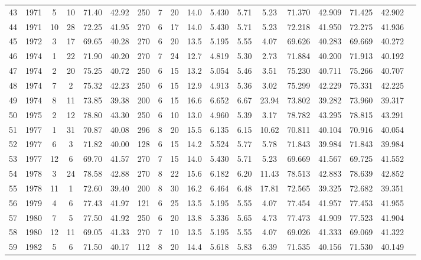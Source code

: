 \begin{longtable}{cccccccccccccccccc}
  43 & 1971 & 5 & 10 & 71.40 & 42.92 & 250 & 7 & 20 & 14.0 & 5.430 & 5.71 & 5.23 & 71.370 & 42.909 & 71.425 & 42.902 \\ 
  44 & 1971 & 10 & 28 & 72.25 & 41.95 & 270 & 6 & 17 & 14.0 & 5.430 & 5.71 & 5.23 & 72.218 & 41.950 & 72.275 & 41.936 \\ 
  45 & 1972 & 3 & 17 & 69.65 & 40.28 & 270 & 6 & 20 & 13.5 & 5.195 & 5.55 & 4.07 & 69.626 & 40.283 & 69.669 & 40.272 \\ 
  46 & 1974 & 1 & 22 & 71.90 & 40.20 & 270 & 7 & 24 & 12.7 & 4.819 & 5.30 & 2.73 & 71.884 & 40.200 & 71.913 & 40.192 \\ 
  47 & 1974 & 2 & 20 & 75.25 & 40.72 & 250 & 6 & 15 & 13.2 & 5.054 & 5.46 & 3.51 & 75.230 & 40.711 & 75.266 & 40.707 \\ 
  48 & 1974 & 7 & 2 & 75.32 & 42.23 & 250 & 6 & 15 & 12.9 & 4.913 & 5.36 & 3.02 & 75.299 & 42.229 & 75.331 & 42.225 \\ 
  49 & 1974 & 8 & 11 & 73.85 & 39.38 & 200 & 6 & 15 & 16.6 & 6.652 & 6.67 & 23.94 & 73.802 & 39.282 & 73.960 & 39.317 \\ 
  50 & 1975 & 2 & 12 & 78.80 & 43.30 & 250 & 6 & 10 & 13.0 & 4.960 & 5.39 & 3.17 & 78.782 & 43.295 & 78.815 & 43.291 \\ 
  51 & 1977 & 1 & 31 & 70.87 & 40.08 & 296 & 8 & 20 & 15.5 & 6.135 & 6.15 & 10.62 & 70.811 & 40.104 & 70.916 & 40.054 \\ 
  52 & 1977 & 6 & 3 & 71.82 & 40.00 & 128 & 6 & 15 & 14.2 & 5.524 & 5.77 & 5.78 & 71.843 & 39.984 & 71.843 & 39.984 \\ 
  53 & 1977 & 12 & 6 & 69.70 & 41.57 & 270 & 7 & 15 & 14.0 & 5.430 & 5.71 & 5.23 & 69.669 & 41.567 & 69.725 & 41.552 \\ 
  54 & 1978 & 3 & 24 & 78.58 & 42.88 & 270 & 8 & 22 & 15.6 & 6.182 & 6.20 & 11.43 & 78.513 & 42.883 & 78.639 & 42.852 \\ 
  55 & 1978 & 11 & 1 & 72.60 & 39.40 & 200 & 8 & 30 & 16.2 & 6.464 & 6.48 & 17.81 & 72.565 & 39.325 & 72.682 & 39.351 \\ 
  56 & 1979 & 4 & 6 & 77.43 & 41.97 & 121 & 6 & 25 & 13.5 & 5.195 & 5.55 & 4.07 & 77.454 & 41.957 & 77.453 & 41.955 \\ 
  57 & 1980 & 7 & 5 & 77.50 & 41.92 & 250 & 6 & 20 & 13.8 & 5.336 & 5.65 & 4.73 & 77.473 & 41.909 & 77.523 & 41.904 \\ 
  58 & 1980 & 12 & 11 & 69.05 & 41.33 & 270 & 7 & 10 & 13.5 & 5.195 & 5.55 & 4.07 & 69.026 & 41.333 & 69.069 & 41.322 \\ 
  59 & 1982 & 5 & 6 & 71.50 & 40.17 & 112 & 8 & 20 & 14.4 & 5.618 & 5.83 & 6.39 & 71.535 & 40.156 & 71.530 & 40.149 \\ 

\end{longtable}
